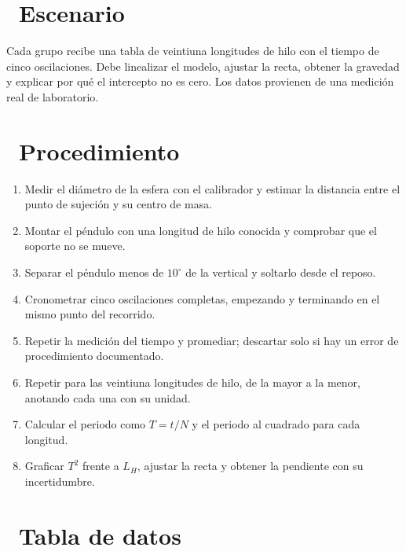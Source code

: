 \documentclass[11pt,a4paper]{article}
\newcommand{\iconotexto}[2]{\textcolor{cyanNeon}{\faIcon{#1}}~#2}
\begin{document}
\section{\iconotexto{flask}{Escenario}}

Cada grupo recibe una tabla de veintiuna longitudes de hilo con el tiempo de cinco oscilaciones. Debe linealizar el modelo, ajustar la recta, obtener la gravedad y explicar por qué el intercepto no es cero. Los datos provienen de una medición real de laboratorio.

\section{\iconotexto{list-ol}{Procedimiento}}

\begin{enumerate}[leftmargin=1.4em,itemsep=2pt,topsep=3pt]
  \item Medir el diámetro de la esfera con el calibrador y estimar la distancia entre el punto de sujeción y su centro de masa.
  \item Montar el péndulo con una longitud de hilo conocida y comprobar que el soporte no se mueve.
  \item Separar el péndulo menos de $10^\circ$ de la vertical y soltarlo desde el reposo.
  \item Cronometrar cinco oscilaciones completas, empezando y terminando en el mismo punto del recorrido.
  \item Repetir la medición del tiempo y promediar; descartar solo si hay un error de procedimiento documentado.
  \item Repetir para las veintiuna longitudes de hilo, de la mayor a la menor, anotando cada una con su unidad.
  \item Calcular el periodo como $T = t/N$ y el periodo al cuadrado para cada longitud.
  \item Graficar $T^2$ frente a $L_H$, ajustar la recta y obtener la pendiente con su incertidumbre.
\end{enumerate}

\section{\iconotexto{table}{Tabla de datos}}
\end{document}
